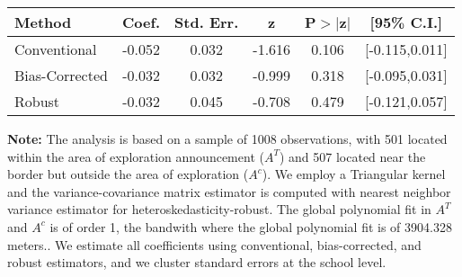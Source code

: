 \begin{table}[htbp]\centering
 \footnotesize 
\begin{tabular}{lccccc}
\hline\hline
Method & Coef. & Std. Err. & z & P$>|$z$|$ & [95\% C.I.] \\ 
\hline \hline  
Conventional & -0.052 & 0.032 & -1.616 & 0.106 & [-0.115,0.011] \\ 
 Bias-Corrected & -0.032 & 0.032 & -0.999 & 0.318 & [-0.095,0.031] \\ 
Robust & -0.032 & 0.045 & -0.708 & 0.479 & [-0.121,0.057] \\ 
  \hline\hline
\end{tabular}
\label{table:rd}
\begin{tablenotes} 
  \justifying \tiny \textbf{Note: }    
   The analysis is based on a sample of 1008 observations, with 501 located within the area of exploration announcement ($A^{T}$) and 507 located near the border but outside the area of exploration  ($A^{c}$). 
           We employ a Triangular kernel and the variance-covariance matrix estimator is computed with nearest neighbor variance estimator for heteroskedasticity-robust. The global polynomial fit in  $A^{T}$ and $A^{c}$ is of order 1, the bandwith where the global polynomial fit is of 3904.328 meters.. We estimate all coefficients using conventional, bias-corrected, and robust estimators, and we cluster standard errors at the school level. \end{tablenotes} 
 \end{table} 
